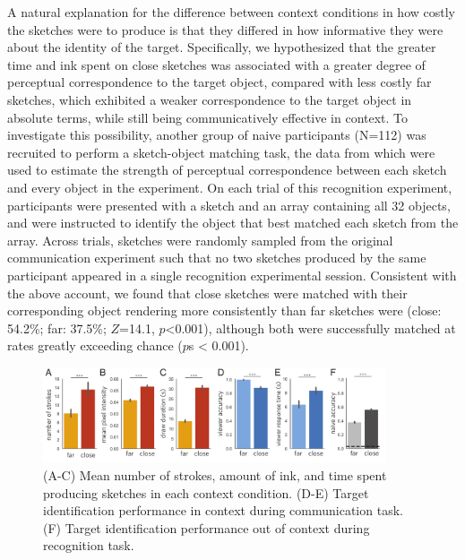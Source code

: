 \documentclass[9pt,twocolumn,twoside]{pnas-new}
\begin{document}
A natural explanation for the difference between context conditions in how costly the sketches were to produce is that they differed in how informative they were about the identity of the target. 
Specifically, we hypothesized that the greater time and ink spent on close sketches was associated with a greater degree of perceptual correspondence to the target object, compared with less costly far sketches, which exhibited a weaker correspondence to the target object in absolute terms, while still being communicatively effective in context. 
To investigate this possibility, another group of naive participants (N=112) was recruited to perform a sketch-object matching task, the data from which were used to estimate the strength of perceptual correspondence between each sketch and every object in the experiment. 
On each trial of this recognition experiment, participants were presented with a sketch and an array containing all 32 objects, and were instructed to identify the object that best matched each sketch from the array. 
Across trials, sketches were randomly sampled from the original communication experiment such that no two sketches produced by the same participant appeared in a single recognition experimental session. 
Consistent with the above account, we found that close sketches were matched with their corresponding object rendering more consistently than far sketches were (close: 54.2\%; far: 37.5\%; $Z$=14.1, $p$<0.001), although both were successfully matched at rates greatly exceeding chance ($p$s < 0.001).

\begin{figure}[htbp]
\centering
\includegraphics[width=0.9\textwidth]{figures/3_behavioral_performance.pdf}
\caption{(A-C) Mean number of strokes, amount of ink, and time spent producing sketches in each context condition. (D-E) Target identification performance in context during communication task. (F) Target identification performance out of context during recognition task.}
\label{task_performance}
\end{figure}
\end{document}
